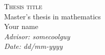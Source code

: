 \begin{titlepage}
	\vspace*{9.0cm}
	{\huge\textsc{Thesis title}}\\[0.2cm]
	{\large Master's thesis in mathematics}\\[0.6cm]
	{\large Your name}\\[7.0cm]
	{\large\textit{Advisor: somecoolguy}}\\[0.4cm]
	{\large\textit{Date: dd/mm-yyyy}}
	\vspace*{\fill}
\end{titlepage}

\noindent
\pagestyle{fancy}
\fancyhead[LO]{\nouppercase\leftmark}
\fancyfoot{}
\setlength\headsep{35pt}

\thispagestyle{empty}
